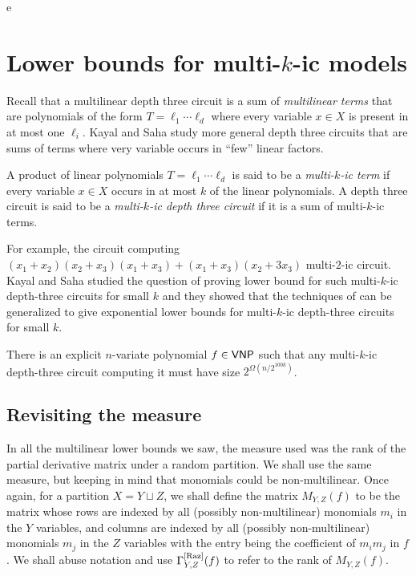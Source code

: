 e\chapter{Lower bounds for multi-$k$-ic models}\label{chap:multi-k-ic}

Recall that a multilinear depth three circuit is a sum of \emph{multilinear terms} that are polynomials of the form $T = \ell_1 \cdots \ell_d$ where every variable $x \in X$ is present in at most one $\ell_i$.
Kayal and Saha \cite{ks15} study more general depth three circuits that are sums of terms where very variable occurs in ``few'' linear factors.

\begin{definition}
  A product of linear polynomials $T = \ell_1 \cdots \ell_d$ is said to be a \emph{multi-$k$-ic term} if every variable $x \in X$ occurs in at most $k$ of the linear polynomials.
A depth three circuit is said to be a \emph{multi-$k$-ic depth three circuit} if it is a sum of multi-$k$-ic terms.
\end{definition}

For example, the circuit computing $(x_1 + x_2)(x_2 + x_3)(x_1 +x_3) + (x_1 + x_3)(x_2 + 3x_3)$ multi-$2$-ic circuit. \\

Kayal and Saha \cite{ks15} studied the question of proving lower bound for such multi-$k$-ic depth-three circuits for small $k$ and they showed that the techniques of \cite{raz2004} can be generalized to give exponential lower bounds for multi-$k$-ic depth-three circuits for small $k$.

\begin{theorem}[\cite{ks15}]\label{thm:multi-k-ic} There is an explicit $n$-variate polynomial $f \in \mathsf{VNP}$ such that any multi-$k$-ic depth-three circuit computing it must have size $2^{\Omega(n/2^{100k})}$.
\end{theorem}

\section{Revisiting the measure}

In all the multilinear lower bounds we saw, the measure used was the rank of the partial derivative matrix under a random partition.
We shall use the same measure, but keeping in mind that monomials could be non-multilinear.
Once again, for a partition $X = Y \sqcup Z$, we shall define the matrix $M_{Y,Z}(f)$ to be the matrix whose rows are indexed by all (possibly non-multilinear) monomials $m_i$ in the $Y$ variables, and columns are indexed by all (possibly non-multilinear) monomials $m_j$ in the $Z$ variables with the entry being the coefficient of $m_i m_j$ in $f$.
We shall abuse notation and use $\Gamma^{\mathrm{[Raz]}}_{Y,Z}(f)$ to refer to the rank of $M_{Y,Z}(f)$.

